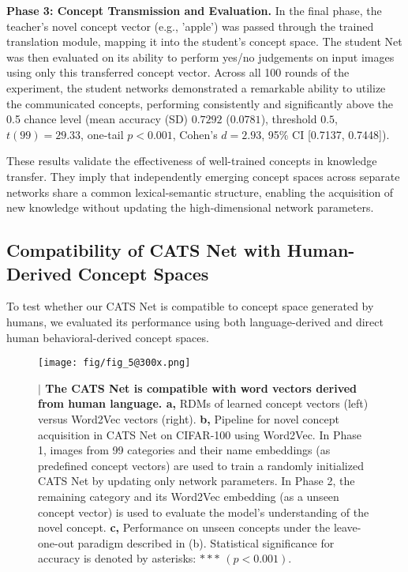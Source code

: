 \documentclass[pdflatex,sn-mathphys-num,lineno]{sn-jnl}%
\begin{document}
\begin{CJK}{UTF8}{gbsn}
\textbf{Phase 3: Concept Transmission and Evaluation.}
In the final phase, the teacher's novel concept vector (e.g., 'apple') was passed through the trained translation module, mapping it into the student's concept space. The student Net was then evaluated on its ability to perform yes/no judgements on input images using only this transferred concept vector. Across all 100 rounds of the experiment, the student networks demonstrated a remarkable ability to utilize the communicated concepts, performing consistently and significantly above the 0.5 chance level (mean accuracy (SD) $0.7292$ ($0.0781$), threshold $0.5$, $t(99)=29.33$, one-tail $p < 0.001$, Cohen's $d=2.93$, 95\% CI [0.7137, 0.7448]).

These results validate the effectiveness of well-trained concepts in knowledge transfer. They imply that independently emerging concept spaces across separate networks share a common lexical-semantic structure, enabling the acquisition of new knowledge without updating the high-dimensional network parameters.

\subsection{Compatibility of CATS Net with Human-Derived Concept Spaces} 

To test whether our CATS Net is compatible to concept space generated by humans, we evaluated its performance using both language-derived and direct human behavioral-derived concept spaces.

\begin{figure}[htbp]
\centering
\texttt{[image: fig/fig\_5@300x.png]}
\caption{\textbf{$\vert$ The CATS Net is compatible with word vectors derived from human language. a, }RDMs of learned concept vectors (left) versus Word2Vec vectors (right). \textbf{b,} Pipeline for novel concept acquisition in CATS Net on CIFAR-100 using Word2Vec. In Phase 1, images from 99 categories and their name embeddings (as predefined concept vectors) are used to train a randomly initialized CATS Net by updating only network parameters. In Phase 2, the remaining category and its Word2Vec embedding (as a unseen concept vector) is used to evaluate the model’s understanding of the novel concept. \textbf{c,} Performance on unseen concepts under the leave-one-out paradigm described in (b). Statistical significance for accuracy is denoted by asterisks: $***$ $(p < 0.001)$.}
\label{fig5}
\end{figure}


\end{CJK}
\end{document}
